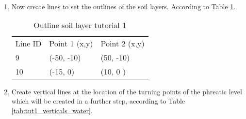 \begin{enumerate}
	\item Now create lines to set the outlines of the soil layers. According to Table \ref{tab:tut1_outline_sl}.


		\begin{table}[h!]
		\centering
		\caption{Outline soil layer tutorial 1}
		\label{tab:tut1_outline_sl}
		\begin{tabular}{lll}
			Line ID  & Point 1 (x,y)& Point 2 (x,y) \\
			9        & (-50, -10)     & (50, -10)      \\
			10       & (-15, 0)       & (10, 0 )         \\
		\end{tabular}
	\end{table}


	\item Create vertical lines at the location of the turning points of the phreatic level which will be created in a further step, according to Table \ref{tab:tut1_verticals_water}. 


\end{enumerate}
